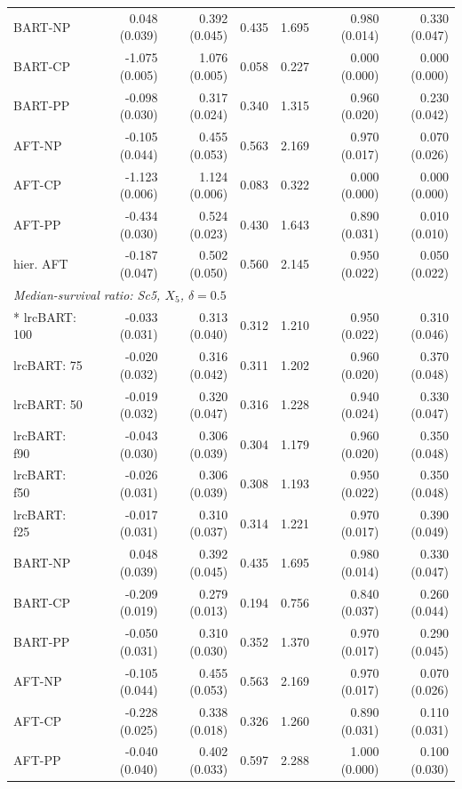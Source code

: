 \begin{landscape}
\begin{longtable}{lrrrrrr}
BART-NP & 0.048 (0.039) & 0.392 (0.045) & 0.435 & 1.695 & 0.980 (0.014) & 0.330 (0.047) \\
BART-CP & -1.075 (0.005) & 1.076 (0.005) & 0.058 & 0.227 & 0.000 (0.000) & 0.000 (0.000) \\
BART-PP & -0.098 (0.030) & 0.317 (0.024) & 0.340 & 1.315 & 0.960 (0.020) & 0.230 (0.042) \\
AFT-NP & -0.105 (0.044) & 0.455 (0.053) & 0.563 & 2.169 & 0.970 (0.017) & 0.070 (0.026) \\
AFT-CP & -1.123 (0.006) & 1.124 (0.006) & 0.083 & 0.322 & 0.000 (0.000) & 0.000 (0.000) \\
AFT-PP & -0.434 (0.030) & 0.524 (0.023) & 0.430 & 1.643 & 0.890 (0.031) & 0.010 (0.010) \\
hier. AFT & -0.187 (0.047) & 0.502 (0.050) & 0.560 & 2.145 & 0.950 (0.022) & 0.050 (0.022) \\
\multicolumn{7}{l}{\strut\textit{Median-survival ratio: Sc5, $X_5$, $\delta=0.5$}}\\*
lrcBART: 100 & -0.033 (0.031) & 0.313 (0.040) & 0.312 & 1.210 & 0.950 (0.022) & 0.310 (0.046) \\
lrcBART: 75 & -0.020 (0.032) & 0.316 (0.042) & 0.311 & 1.202 & 0.960 (0.020) & 0.370 (0.048) \\
lrcBART: 50 & -0.019 (0.032) & 0.320 (0.047) & 0.316 & 1.228 & 0.940 (0.024) & 0.330 (0.047) \\
lrcBART: f90 & -0.043 (0.030) & 0.306 (0.039) & 0.304 & 1.179 & 0.960 (0.020) & 0.350 (0.048) \\
lrcBART: f50 & -0.026 (0.031) & 0.306 (0.039) & 0.308 & 1.193 & 0.950 (0.022) & 0.350 (0.048) \\
lrcBART: f25 & -0.017 (0.031) & 0.310 (0.037) & 0.314 & 1.221 & 0.970 (0.017) & 0.390 (0.049) \\
BART-NP & 0.048 (0.039) & 0.392 (0.045) & 0.435 & 1.695 & 0.980 (0.014) & 0.330 (0.047) \\
BART-CP & -0.209 (0.019) & 0.279 (0.013) & 0.194 & 0.756 & 0.840 (0.037) & 0.260 (0.044) \\
BART-PP & -0.050 (0.031) & 0.310 (0.030) & 0.352 & 1.370 & 0.970 (0.017) & 0.290 (0.045) \\
AFT-NP & -0.105 (0.044) & 0.455 (0.053) & 0.563 & 2.169 & 0.970 (0.017) & 0.070 (0.026) \\
AFT-CP & -0.228 (0.025) & 0.338 (0.018) & 0.326 & 1.260 & 0.890 (0.031) & 0.110 (0.031) \\
AFT-PP & -0.040 (0.040) & 0.402 (0.033) & 0.597 & 2.288 & 1.000 (0.000) & 0.100 (0.030) \\

\end{longtable}
\end{landscape}
